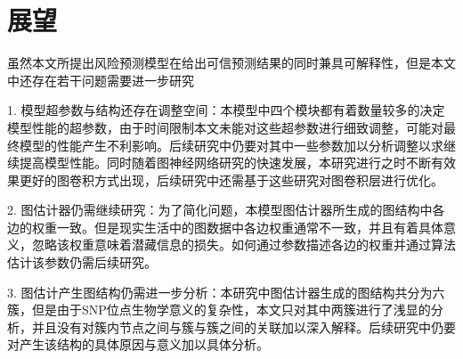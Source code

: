 \section{展望}

虽然本文所提出风险预测模型在给出可信预测结果的同时兼具可解释性，但是本文中还存在若干问题需要进一步研究

1. 模型超参数与结构还存在调整空间：本模型中四个模块都有着数量较多的决定模型性能的超参数，由于时间限制本文未能对这些超参数进行细致调整，可能对最终模型的性能产生不利影响。后续研究中仍要对其中一些参数加以分析调整以求继续提高模型性能。同时随着图神经网络研究的快速发展，本研究进行之时不断有效果更好的图卷积方式出现，后续研究中还需基于这些研究对图卷积层进行优化。

2. 图估计器仍需继续研究：为了简化问题，本模型图估计器所生成的图结构中各边的权重一致。但是现实生活中的图数据中各边权重通常不一致，并且有着具体意义，忽略该权重意味着潜藏信息的损失。如何通过参数描述各边的权重并通过算法估计该参数仍需后续研究。

3. 图估计产生图结构仍需进一步分析：本研究中图估计器生成的图结构共分为六簇，但是由于SNP位点生物学意义的复杂性，本文只对其中两簇进行了浅显的分析，并且没有对簇内节点之间与簇与簇之间的关联加以深入解释。后续研究中仍要对产生该结构的具体原因与意义加以具体分析。
